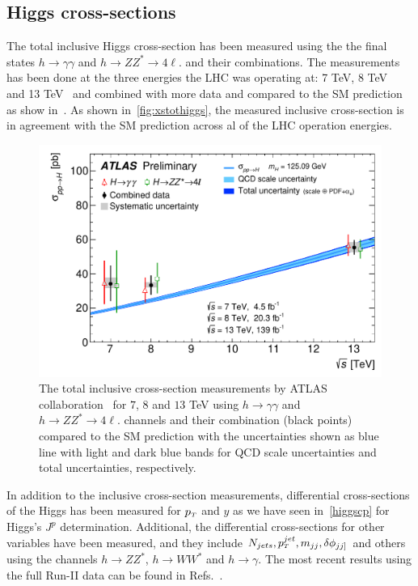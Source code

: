 \subsection{Higgs cross-sections}
\par The total inclusive Higgs cross-section has been measured using the the final states $ h \to \gamma \gamma$ and $ h\to Z Z^* \to 4 \ell$. and their combinations.  The measurements has been done at the three energies the LHC was operating at: 7 TeV, 8 TeV ~\cite{CMS:2015zpx} and 13 TeV~\cite{TheATLAScollaboration:2015uuh,CMS:2018gwt,CMS:2021ugl} and combined with more data and compared to the SM prediction as show in~\cite{ATLAS:2019mju}. As shown in~\autoref{fig:xstothiggs}, the measured inclusive cross-section is in agreement with the SM prediction across al of the LHC operation energies.
\begin{figure}[htb!]
	\begin{center}
		\includegraphics[height=0.35\textheight]{figures/Higgs_results/fig_01}
		\caption{The total inclusive cross-section measurements by ATLAS collaboration~\cite{ATLAS:2019mju} for $7$, $8$ and $13$ TeV using  $ h \to \gamma \gamma$ and $ h\to Z Z^* \to 4 \ell$. channels and their combination (black points) compared to the SM prediction with the  uncertainties shown as blue line with light and dark blue bands for QCD scale uncertainties and total uncertainties, respectively. }	
		\label{fig:xstothiggs}
	\end{center}
\end{figure}
\par In addition to the inclusive cross-section measurements,  differential cross-sections of the Higgs has been measured for $p_{\scriptscriptstyle T}$ and  $y$ as we have seen in~\autoref{higgscp} for Higgs's $J^p$ determination. Additional,  the differential cross-sections for other variables have been measured, and they include $N_{jets}, p_{\scriptscriptstyle T}^{jet}, m_{jj},\delta \phi_{jj]}$ and others using the channels $ h \to ZZ^*$, $h \to W W^*$ and $ h \to \gamma$. The most recent results using the full Run-II data can be found in Refs.~\cite{CMS:2018gwt,ATLAS:2019jst,ATLAS:2019mju,CMS:2019chr}.  
